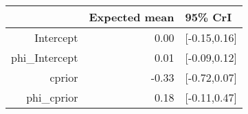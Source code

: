 \begin{tabular}{rrl}
  \hline
 & Expected mean & 95\% CrI \\ 
  \hline
Intercept & 0.00 & [-0.15,0.16] \\ 
  phi\_Intercept & 0.01 & [-0.09,0.12] \\ 
  cprior & -0.33 & [-0.72,0.07] \\ 
  phi\_cprior & 0.18 & [-0.11,0.47] \\ 
   \hline
\end{tabular}

